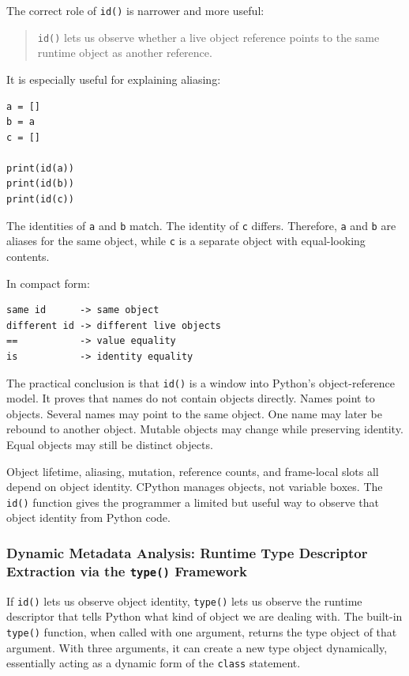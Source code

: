 The correct role of \texttt{id()} is narrower and more useful:

\begin{quote}
\texttt{id()} lets us observe whether a live object reference points to the same runtime object as another reference.
\end{quote}

It is especially useful for explaining aliasing:

\begin{verbatim}
a = []
b = a
c = []

print(id(a))
print(id(b))
print(id(c))
\end{verbatim}

The identities of \texttt{a} and \texttt{b} match. The identity of \texttt{c} differs. Therefore, \texttt{a} and \texttt{b} are aliases for the same object, while \texttt{c} is a separate object with equal-looking contents.

In compact form:

\begin{verbatim}
same id      -> same object
different id -> different live objects
==           -> value equality
is           -> identity equality
\end{verbatim}

The practical conclusion is that \texttt{id()} is a window into Python's object-reference model. It proves that names do not contain objects directly. Names point to objects. Several names may point to the same object. One name may later be rebound to another object. Mutable objects may change while preserving identity. Equal objects may still be distinct objects.

Object lifetime, aliasing, mutation, reference counts, and frame-local slots all depend on object identity. CPython manages objects, not variable boxes. The \texttt{id()} function gives the programmer a limited but useful way to observe that object identity from Python code.


\subsubsection{Dynamic Metadata Analysis: Runtime Type Descriptor Extraction via the \texttt{type()} Framework}

If \texttt{id()} lets us observe object identity, \texttt{type()} lets us observe the runtime descriptor that tells Python what kind of object we are dealing with. The built-in \texttt{type()} function, when called with one argument, returns the type object of that argument. With three arguments, it can create a new type object dynamically, essentially acting as a dynamic form of the \texttt{class} statement. \cite{python_builtin_type}

